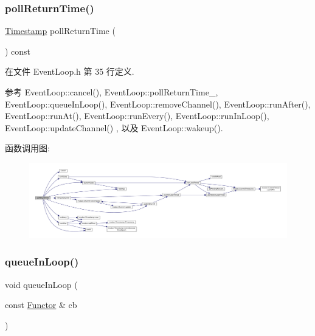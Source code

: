 \subsubsection{\texorpdfstring{poll\+Return\+Time()}{pollReturnTime()}}
{\footnotesize\ttfamily \hyperlink{classmuduo_1_1Timestamp}{Timestamp} poll\+Return\+Time (\begin{DoxyParamCaption}{ }\end{DoxyParamCaption}) const\hspace{0.3cm}{\ttfamily [inline]}}



在文件 Event\+Loop.\+h 第 35 行定义.



参考 Event\+Loop\+::cancel(), Event\+Loop\+::poll\+Return\+Time\+\_\+, Event\+Loop\+::queue\+In\+Loop(), Event\+Loop\+::remove\+Channel(), Event\+Loop\+::run\+After(), Event\+Loop\+::run\+At(), Event\+Loop\+::run\+Every(), Event\+Loop\+::run\+In\+Loop(), Event\+Loop\+::update\+Channel() , 以及 Event\+Loop\+::wakeup().

函数调用图\+:
\nopagebreak
\begin{figure}[H]
\begin{center}
\leavevmode
\includegraphics[width=350pt]{classmuduo_1_1EventLoop_a5c4a9a6cf52fc408cdd33c8445fb5127_cgraph}
\end{center}
\end{figure}
\mbox{\label{classmuduo_1_1EventLoop_a7d2b6939f8f94715d253c0d4c6cee207}} 
\subsubsection{\texorpdfstring{queue\+In\+Loop()}{queueInLoop()}}
{\footnotesize\ttfamily void queue\+In\+Loop (\begin{DoxyParamCaption}\item[{const \hyperlink{classmuduo_1_1EventLoop_aa47556388c5bf0b2534c9816841d8e7a}{Functor} \&}]{cb }\end{DoxyParamCaption})}

